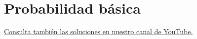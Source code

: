 \chapter{Probabilidad básica}

 \href{https://youtube.com/playlist?list=PLI6aSzD0tfIM3VJhCcTle_n-4I2avgMX-}{Consulta también las soluciones en nuestro canal de YouTube.}










